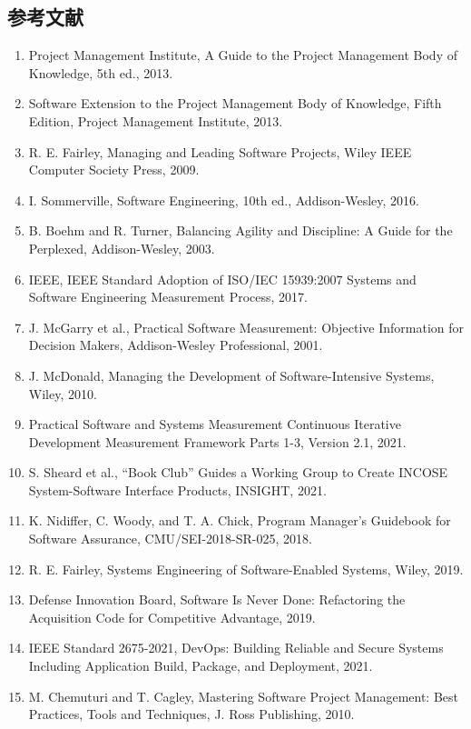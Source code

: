 \subsection{参考文献}
\begin{enumerate}[leftmargin=2em]
  \item Project Management Institute, A Guide to the Project Management Body of Knowledge, 5th ed., 2013.
  \item Software Extension to the Project Management Body of Knowledge, Fifth Edition, Project Management Institute, 2013.
  \item R. E. Fairley, Managing and Leading Software Projects, Wiley IEEE Computer Society Press, 2009.
  \item I. Sommerville, Software Engineering, 10th ed., Addison-Wesley, 2016.
  \item B. Boehm and R. Turner, Balancing Agility and Discipline: A Guide for the Perplexed, Addison-Wesley, 2003.
  \item IEEE, IEEE Standard Adoption of ISO/IEC 15939:2007 Systems and Software Engineering Measurement Process, 2017.
  \item J. McGarry et al., Practical Software Measurement: Objective Information for Decision Makers, Addison-Wesley Professional, 2001.
  \item J. McDonald, Managing the Development of Software-Intensive Systems, Wiley, 2010.
  \item Practical Software and Systems Measurement Continuous Iterative Development Measurement Framework Parts 1-3, Version 2.1, 2021.
  \item S. Sheard et al., “Book Club” Guides a Working Group to Create INCOSE System-Software Interface Products, INSIGHT, 2021.
  \item K. Nidiffer, C. Woody, and T. A. Chick, Program Manager’s Guidebook for Software Assurance, CMU/SEI-2018-SR-025, 2018.
  \item R. E. Fairley, Systems Engineering of Software-Enabled Systems, Wiley, 2019.
  \item Defense Innovation Board, Software Is Never Done: Refactoring the Acquisition Code for Competitive Advantage, 2019.
  \item IEEE Standard 2675-2021, DevOps: Building Reliable and Secure Systems Including Application Build, Package, and Deployment, 2021.
  \item M. Chemuturi and T. Cagley, Mastering Software Project Management: Best Practices, Tools and Techniques, J. Ross Publishing, 2010.
\end{enumerate}
